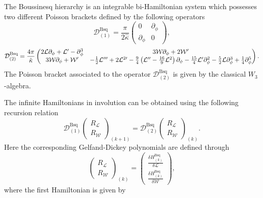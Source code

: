 \documentclass[letterpaper,11pt,oneside]{book}
\begin{document}
The Boussinesq hierarchy is an integrable bi-Hamiltonian system which
possesses two different Poisson brackets defined by the following
operators
\begin{equation}
	\mathcal{D}_{\left(1\right)}^{\text{Bsq}}=\frac{\pi}{2\hat{\kappa}}\left(\begin{array}{cc}
		0 & \partial_{\phi}\\
		\partial_{\phi} & 0
	\end{array}\right),\label{eq:Bq Operators}
\end{equation}
\[
\mathcal{D}_{\left(2\right)}^{\text{Bsq}}=\frac{4\pi}{\hat{\kappa}}\begin{pmatrix}2{\cal L}\partial_{\phi}+{\cal L}^{\prime}-\partial_{\phi}^{3} & 3\mathcal{W}\partial_{\phi}+2\mathcal{W}^{\prime}\\
	3\mathcal{W}\partial_{\phi}+\mathcal{W}^{\prime} & -\frac{1}{2}\mathcal{L}^{\prime\prime\prime}+2\mathcal{L}^{2\prime}-\frac{9}{4}\left(\mathcal{L}^{\prime\prime}-\frac{16}{9}\mathcal{L}^{2}\right)\partial_{\phi}-\frac{15}{4}{\cal L}^{\prime}\partial_{\phi}^{2}-\frac{5}{2}{\cal L}\partial_{\phi}^{3}+\frac{1}{4}\partial_{\phi}^{5}
\end{pmatrix}.
\]
The Poisson bracket associated to the operator $\mathcal{D}_{\left(2\right)}^{\text{Bsq}}$
is given by the classical $W_{3}$-algebra.

The infinite Hamiltonians in involution can be obtained using the
following recursion relation
\[
\mathcal{D}_{(1)}^{\text{Bsq}}\left(\begin{array}{c}
	R_{\mathcal{L}}\\
	R_{\mathcal{W}}
\end{array}\right)_{\left(k+1\right)}=\mathcal{D}_{(2)}^{\text{Bsq}}\left(\begin{array}{c}
	R_{\mathcal{L}}\\
	R_{\mathcal{W}}
\end{array}\right)_{\left(k\right)}.
\]
Here the corresponding Gelfand-Dickey polynomials are defined through
\[
\left(\begin{array}{c}
	R_{\mathcal{L}}\\
	R_{\mathcal{W}}
\end{array}\right)_{\left(k\right)}=\begin{pmatrix}\frac{\delta H_{\left(k\right)}^{\text{Bsq}}}{\delta\mathcal{L}}\\
	\frac{\delta H_{\left(k\right)}^{\text{Bsq}}}{\delta\mathcal{\mathcal{W}}}
\end{pmatrix},
\]
where the first Hamiltonian is given by
\end{document}
